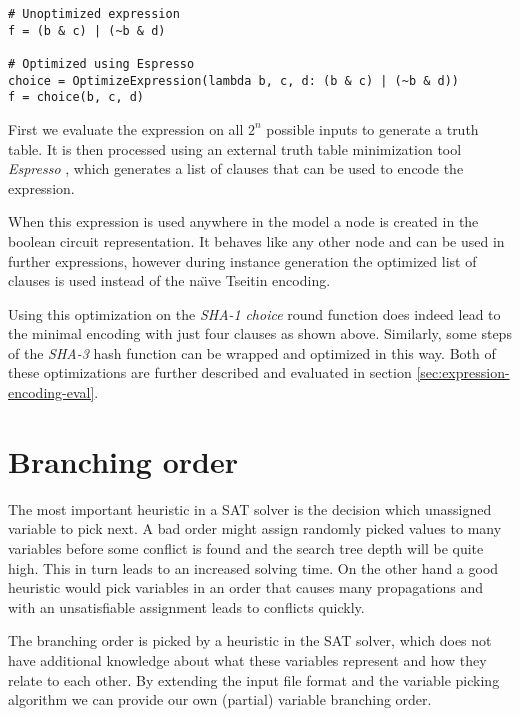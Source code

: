 \begin{verbatim}
# Unoptimized expression
f = (b & c) | (~b & d)

# Optimized using Espresso
choice = OptimizeExpression(lambda b, c, d: (b & c) | (~b & d))
f = choice(b, c, d)
\end{verbatim}


First we evaluate the expression on all $2^n$ possible inputs to generate a truth table.
It is then processed using an external truth table minimization tool \emph{Espresso} \cite{rudell1986multiple}, which generates a list of clauses that can be used to encode the expression.

When this expression is used anywhere in the model a node is created in the boolean circuit representation.
It behaves like any other node and can be used in further expressions, however during instance generation the optimized list of clauses is used instead of the na\"{\i}ve Tseitin encoding.

Using this optimization on the \emph{SHA-1} \emph{choice} round function does indeed lead to the minimal encoding with just four clauses as shown above.
Similarly, some steps of the \emph{SHA-3} hash function can be wrapped and optimized in this way.
Both of these optimizations are further described and evaluated in section \ref{sec:expression-encoding-eval}.

\section{Branching order}
\label{sec:branching-order}

The most important heuristic in a SAT solver is the decision which unassigned variable to pick next.
A bad order might assign randomly picked values to many variables before some conflict is found and the search tree depth will be quite high.
This in turn leads to an increased solving time.
On the other hand a good heuristic would pick variables in an order that causes many propagations and with an unsatisfiable assignment leads to conflicts quickly.

The branching order is picked by a heuristic in the SAT solver, which does not have additional knowledge about what these variables represent and how they relate to each other.
By extending the input file format and the variable picking algorithm we can provide our own (partial) variable branching order.

